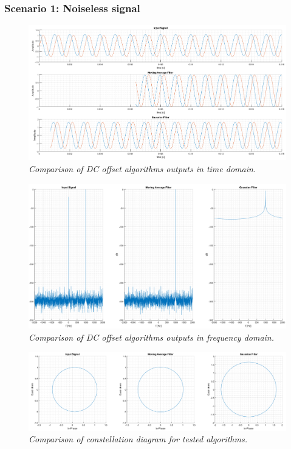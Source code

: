 \documentclass[en,printmode]{mgr}
\begin{document}
		\subsubsection*{Scenario 1: Noiseless signal}
			\vspace{1cm}	
			\begin{figure}[H]
    			\centering
   				\includegraphics[width=\textwidth]{plots/dc_comp.png}
   		 		\caption{\textit{Comparison of DC offset algorithms outputs in time domain.}}
			\end{figure}
			\vspace{1cm}		
			\begin{figure}[!htb]
    			\centering
   				\includegraphics[width=\textwidth]{plots/dc_f.png}
   		 		\caption{\textit{Comparison of DC offset algorithms outputs in frequency domain.}}
			\end{figure}		
			\begin{figure}[!htb]
    			\centering
   				\includegraphics[width=\textwidth]{plots/dc_c.png}
   		 		\caption{\textit{Comparison of constellation diagram for tested algorithms.}}
			\end{figure}
			
\end{document}
